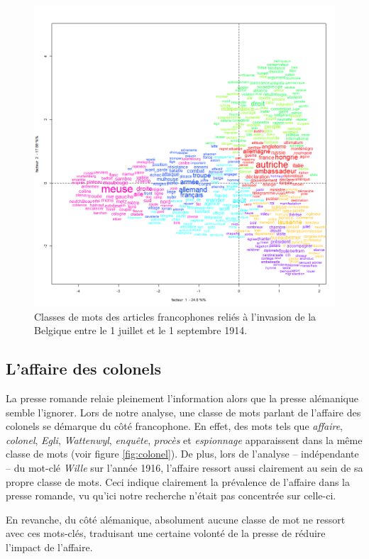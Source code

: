 \documentclass[french,a4paper]{article}
\begin{document}
\begin{figure}[h]
    \centering
    \includegraphics[width=12cm]{imgs/FR/Belgique_15classes.png}
    \caption{Classes de mots des articles francophones reliés à l'invasion de la Belgique entre le 1\ier{} juillet et le 1\ier{} septembre 1914.}
    \label{fig:belgique}
\end{figure}

\subsection*{L'affaire des colonels}

La presse romande relaie pleinement l'information alors que la presse alémanique semble l'ignorer.
Lors de notre analyse, une classe de mots parlant de l'affaire des colonels se démarque du côté francophone.
En effet, des mots tels que  \textit{affaire}, \textit{colonel}, \textit{Egli}, \textit{Wattenwyl}, \textit{enquête}, \textit{procès}  et \textit{espionnage} apparaissent dans la même classe de mots (voir figure \ref{fig:colonel}).
De plus, lors de l'analyse -- indépendante -- du mot-clé \textit{Wille} sur l'année 1916, l'affaire ressort aussi clairement au sein de sa propre classe de mots.
Ceci indique clairement la prévalence de l'affaire dans la presse romande, vu qu'ici notre recherche n'était pas concentrée sur celle-ci.

En revanche, du côté alémanique, absolument aucune classe de mot ne ressort avec ces mots-clés, traduisant une certaine volonté de la presse de réduire l'impact de l'affaire.
\end{document}
